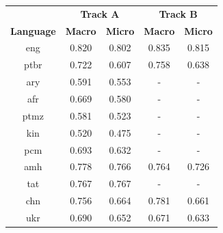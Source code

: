 \documentclass[11pt]{article}
\begin{document}
\begin{table}[]
\centering
\begin{tabular}{ccccc}
\hline
                                    & \multicolumn{2}{c}{\textbf{Track A}}                        & \multicolumn{2}{c}{\textbf{Track B}}                        \\
\multirow{-2}{*}{\textbf{Language}} & \textbf{Macro}               & \textbf{Micro}               & \textbf{Macro}               & \textbf{Micro}               \\ \hline
eng                                 & {\color[HTML]{212121} 0.820} & {\color[HTML]{212121} 0.802} & {\color[HTML]{212121} 0.835} & {\color[HTML]{212121} 0.815} \\
{\color[HTML]{212121} ptbr} & {\color[HTML]{212121} 0.722} & {\color[HTML]{212121} 0.607} & {\color[HTML]{212121} 0.758} & {\color[HTML]{212121} 0.638} \\
{\color[HTML]{212121} ary}          & {\color[HTML]{212121} 0.591} & {\color[HTML]{212121} 0.553} & {\color[HTML]{212121} -}     & {\color[HTML]{212121} -}     \\
{\color[HTML]{212121} afr}          & {\color[HTML]{212121} 0.669} & {\color[HTML]{212121} 0.580} & {\color[HTML]{212121} -}     & {\color[HTML]{212121} -}     \\
{\color[HTML]{212121} ptmz}         & {\color[HTML]{212121} 0.581} & {\color[HTML]{212121} 0.523} & {\color[HTML]{212121} -}     & {\color[HTML]{212121} -}     \\
{\color[HTML]{212121} kin}          & {\color[HTML]{212121} 0.520} & {\color[HTML]{212121} 0.475} & -                            & -                            \\
{\color[HTML]{212121} pcm}          & {\color[HTML]{212121} 0.693} & {\color[HTML]{212121} 0.632} & -                            & -                            \\
{\color[HTML]{212121} amh}          & {\color[HTML]{212121} 0.778} & {\color[HTML]{212121} 0.766} & {\color[HTML]{212121} 0.764} & {\color[HTML]{212121} 0.726} \\
{\color[HTML]{212121} tat}          & {\color[HTML]{212121} 0.767} & {\color[HTML]{212121} 0.767} & -                            & -                            \\
{\color[HTML]{212121} chn}          & {\color[HTML]{212121} 0.756} & {\color[HTML]{212121} 0.664} & {\color[HTML]{212121} 0.781} & {\color[HTML]{212121} 0.661} \\
{\color[HTML]{212121} ukr}          & {\color[HTML]{212121} 0.690} & {\color[HTML]{212121} 0.652} & {\color[HTML]{212121} 0.671} & {\color[HTML]{212121} 0.633} \\

\end{tabular}
\end{table}
\end{document}

